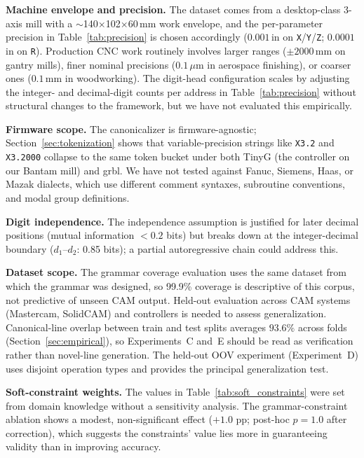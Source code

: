 \documentclass[sensors,article,submit,moreauthors,pdftex]{Definitions/mdpi}
\begin{document}
\textbf{Machine envelope and precision.} The dataset comes from a desktop-class 3-axis mill with a $\sim$140$\times$102$\times$60\,mm work envelope, and the per-parameter precision in Table~\ref{tab:precision} is chosen accordingly ($0.001$\,in on \texttt{X}/\texttt{Y}/\texttt{Z}; $0.0001$\,in on \texttt{R}). Production CNC work routinely involves larger ranges ($\pm 2000$\,mm on gantry mills), finer nominal precisions ($0.1\,\mu$m in aerospace finishing), or coarser ones ($0.1$\,mm in woodworking). The digit-head configuration scales by adjusting the integer- and decimal-digit counts per address in Table~\ref{tab:precision} without structural changes to the framework, but we have not evaluated this empirically.

\textbf{Firmware scope.} The canonicalizer is firmware-agnostic; Section~\ref{sec:tokenization} shows that variable-precision strings like \texttt{X3.2} and \texttt{X3.2000} collapse to the same token bucket under both TinyG (the controller on our Bantam mill) and grbl. We have not tested against Fanuc, Siemens, Haas, or Mazak dialects, which use different comment syntaxes, subroutine conventions, and modal group definitions.

\textbf{Digit independence.} The independence assumption is justified for later decimal positions (mutual information $< 0.2$ bits) but breaks down at the integer-decimal boundary ($d_{1}$--$d_{2}$: 0.85 bits); a partial autoregressive chain could address this.

\textbf{Dataset scope.} The grammar coverage evaluation uses the same dataset from which the grammar was designed, so 99.9\% coverage is descriptive of this corpus, not predictive of unseen CAM output. Held-out evaluation across CAM systems (Mastercam, SolidCAM) and controllers is needed to assess generalization. Canonical-line overlap between train and test splits averages $93.6\%$ across folds (Section~\ref{sec:empirical}), so Experiments~C and~E should be read as verification rather than novel-line generation. The held-out OOV experiment (Experiment~D) uses disjoint operation types and provides the principal generalization test.

\textbf{Soft-constraint weights.} The values in Table~\ref{tab:soft_constraints} were set from domain knowledge without a sensitivity analysis. The grammar-constraint ablation shows a modest, non-significant effect ($+1.0$ pp; post-hoc $p = 1.0$ after correction), which suggests the constraints' value lies more in guaranteeing validity than in improving accuracy.
\end{document}

